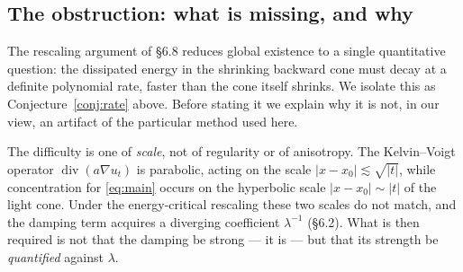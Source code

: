 \documentclass[11pt,letterpaper]{amsart}
\newcommand{\dive}{\operatorname{div}}
\begin{document}
\subsection{The obstruction: what is missing, and why}\label{sec:6.9}

The rescaling argument of \S6.8 reduces global existence to a single
quantitative question: the dissipated energy in the shrinking backward
cone must decay at a definite polynomial rate, faster than the cone
itself shrinks. We isolate this as Conjecture~\ref{conj:rate} above.
Before stating it we explain why it is not, in our view, an artifact of
the particular method used here.

The difficulty is one of \emph{scale}, not of regularity or of
anisotropy. The Kelvin--Voigt operator $\dive(a\nabla u_t)$ is
parabolic, acting on the scale $|x-x_0|\lesssim\sqrt{|t|}$, while
concentration for \eqref{eq:main} occurs on the hyperbolic scale
$|x-x_0|\sim|t|$ of the light cone. Under the energy-critical rescaling
these two scales do not match, and the damping term acquires a diverging
coefficient $\lambda^{-1}$ (\S6.2). What is then required is not that
the damping be strong --- it is --- but that its strength be
\emph{quantified} against $\lambda$.
\end{document}

